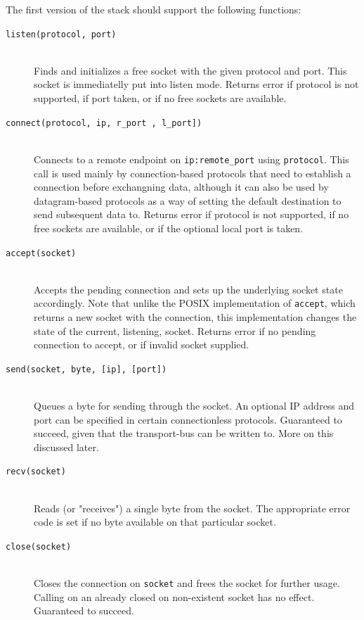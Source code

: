 The first version of the stack should support the following functions:
\begin{description}
\item[\texttt{listen(protocol, port)}]\hfill\\
    Finds and initializes a free socket with the given protocol and port. This 
    socket is immediatelly put into listen mode.
    Returns error if protocol is not supported, if port taken, or if no free sockets 
    are available.
\item[\texttt{connect(protocol, ip, r\_port , l\_port])}]\hfill\\
    Connects to a remote endpoint on \texttt{ip:remote\_port} using \texttt{protocol}.
    This call is used mainly by connection-based protocols that need to 
    establish a connection before exchangning data, although it can also be used 
    by datagram-based protocols as a way of setting the default destination to
    send subsequent data to.
    Returns error if protocol is not supported, if no free sockets are available,
    or if the optional local port is taken.

\item[\texttt{accept(socket)}]\hfill\\
    Accepts the pending connection and sets up the underlying socket state 
    accordingly. Note that unlike the POSIX implementation of \texttt{accept},
    which returns a new socket with the connection, this implementation changes 
    the state of the current, listening, socket.
    Returns error if no pending connection to accept, or if invalid socket 
    supplied.

\item[\texttt{send(socket, byte, [ip], [port])}]\hfill\\
    Queues a byte for sending through the socket. An optional IP address and 
    port can be specified in certain connectionless protocols. 
    Guaranteed to succeed, given that the transport-bus can be written to. More 
    on this discussed later.  
\item[\texttt{recv(socket)}]\hfill\\
    Reads (or "receives") a single byte from the socket. The appropriate error
    code is set if no byte available on that particular socket.

\item[\texttt{close(socket)}]\hfill\\
    Closes the connection on \texttt{socket} and frees the socket for further 
    usage. Calling on an already closed on non-existent socket has no effect.
    Guaranteed to succeed.

\end{description}

